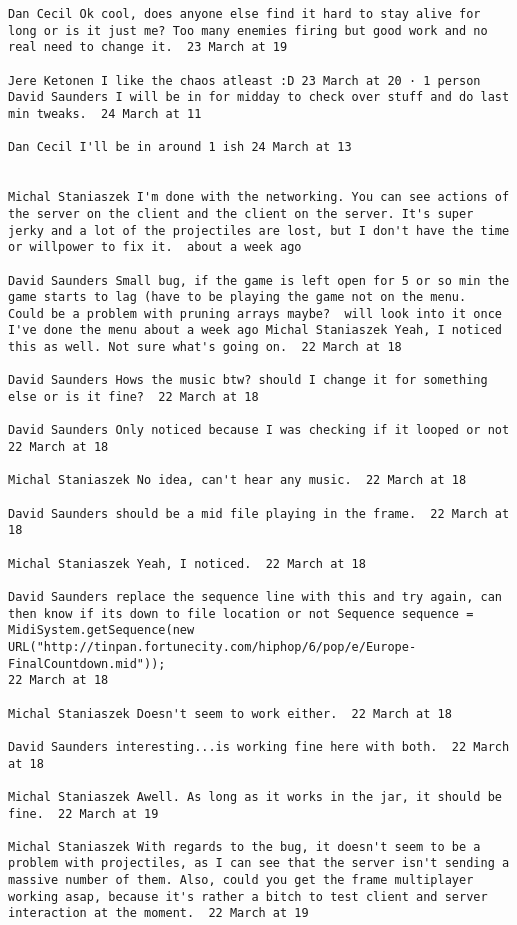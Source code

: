 \begin{verbatim}
Dan Cecil Ok cool, does anyone else find it hard to stay alive for
long or is it just me? Too many enemies firing but good work and no
real need to change it.  23 March at 19

Jere Ketonen I like the chaos atleast :D 23 March at 20 · 1 person
David Saunders I will be in for midday to check over stuff and do last
min tweaks.  24 March at 11

Dan Cecil I'll be in around 1 ish 24 March at 13


Michal Staniaszek I'm done with the networking. You can see actions of
the server on the client and the client on the server. It's super
jerky and a lot of the projectiles are lost, but I don't have the time
or willpower to fix it.  about a week ago

David Saunders Small bug, if the game is left open for 5 or so min the
game starts to lag (have to be playing the game not on the menu.
Could be a problem with pruning arrays maybe?  will look into it once
I've done the menu about a week ago Michal Staniaszek Yeah, I noticed
this as well. Not sure what's going on.  22 March at 18

David Saunders Hows the music btw? should I change it for something
else or is it fine?  22 March at 18

David Saunders Only noticed because I was checking if it looped or not
22 March at 18

Michal Staniaszek No idea, can't hear any music.  22 March at 18

David Saunders should be a mid file playing in the frame.  22 March at
18

Michal Staniaszek Yeah, I noticed.  22 March at 18

David Saunders replace the sequence line with this and try again, can
then know if its down to file location or not Sequence sequence =
MidiSystem.getSequence(new
URL("http://tinpan.fortunecity.com/hiphop/6/pop/e/Europe-FinalCountdown.mid"));
22 March at 18

Michal Staniaszek Doesn't seem to work either.  22 March at 18

David Saunders interesting...is working fine here with both.  22 March
at 18

Michal Staniaszek Awell. As long as it works in the jar, it should be
fine.  22 March at 19

Michal Staniaszek With regards to the bug, it doesn't seem to be a
problem with projectiles, as I can see that the server isn't sending a
massive number of them. Also, could you get the frame multiplayer
working asap, because it's rather a bitch to test client and server
interaction at the moment.  22 March at 19


\end{verbatim}
